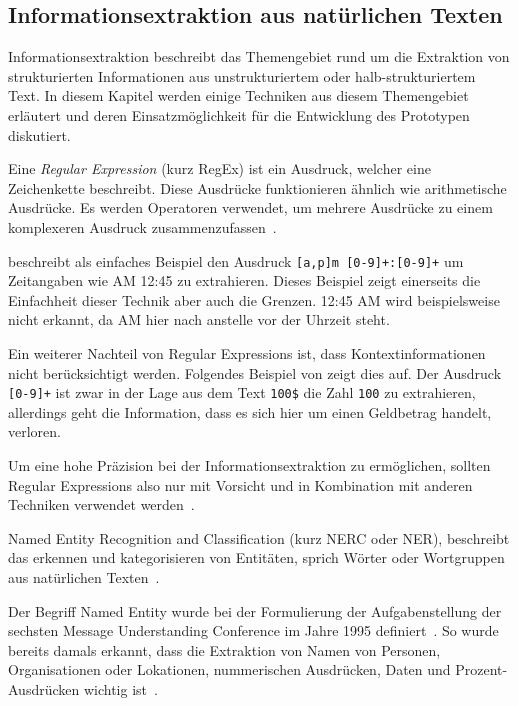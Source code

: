 \subsection{Informationsextraktion aus natürlichen Texten}
\label{chap:ner}


Informationsextraktion beschreibt das Themengebiet rund um die Extraktion von strukturierten Informationen aus unstrukturiertem oder halb-strukturiertem Text. In diesem Kapitel werden einige Techniken aus diesem Themengebiet erläutert und deren Ein\-satz\-mög\-lich\-keit für die Entwicklung des Prototypen diskutiert.

Eine \textit{Regular Expression} (kurz RegEx) ist ein Ausdruck, welcher eine Zeichenkette beschreibt. Diese Ausdrücke funktionieren ähnlich wie arithmetische Ausdrücke. Es werden Operatoren verwendet, um mehrere Ausdrücke zu einem komplexeren Ausdruck zusammenzufassen~\autocite{Xiao2004}.

\textcite{Xiao2004} beschreibt als einfaches Beispiel den Ausdruck \texttt{[a,p]m [0-9]+:[0-9]+} um Zeitangaben wie AM 12:45 zu extrahieren. Dieses Beispiel zeigt einerseits die Einfachheit dieser Technik aber auch die Grenzen. 12:45 AM wird beispielsweise nicht erkannt, da AM hier nach anstelle vor der Uhrzeit steht. 

Ein weiterer Nachteil von Regular Expressions ist, dass Kontextinformationen nicht be\-rück\-sich\-tigt werden. Folgendes Beispiel von \textcite{Xiao2004} zeigt dies auf. Der Ausdruck \texttt{[0-9]+} ist zwar in der Lage aus dem Text \texttt{100\$} die Zahl \texttt{100} zu extrahieren, allerdings geht die Information, dass es sich hier um einen Geldbetrag handelt, verloren.

Um eine hohe Präzision bei der Informationsextraktion zu ermöglichen, sollten Regular Expressions also nur mit Vorsicht und in Kombination mit anderen Techniken verwendet werden~\autocite{Xiao2004}.

Named Entity Recognition and Classification (kurz NERC oder NER), beschreibt das erkennen und kategorisieren von Entitäten, sprich Wörter oder Wortgruppen aus natürlichen Texten~\autocite{Nadeau2007}.

Der Begriff Named Entity wurde bei der Formulierung der Aufgabenstellung der sechsten Message Understanding Conference im Jahre 1995 definiert~\autocite{Borthwick1998}. So wurde bereits damals erkannt, dass die Extraktion von Namen von Personen, Organisationen oder Lokationen, nummerischen Ausdrücken, Daten und Prozent-Ausdrücken wichtig ist~\autocite{Nadeau2007}.

